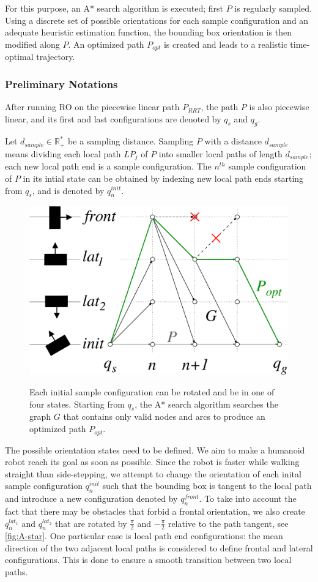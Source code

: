 For this purpose, an A* search algorithm is executed; first $P$ is
regularly sampled. Using a discrete set of possible orientations for
each sample configuration and an adequate heuristic estimation
function, the bounding box orientation is then modified along $P$. An
optimized path $P_{opt}$ is created and leads to a realistic
time-optimal trajectory.

\subsubsection{Preliminary Notations}
After running RO on the piecewise linear path $P_{RRT}$, the
path $P$ is also piecewise linear, and its first and last
configurations are denoted by $q_s$ and $q_g$.

Let $d_{sample} \in \mathbb{R}_+^*$ be a sampling distance. Sampling
$P$ with a distance $d_{sample}$ means dividing each local path $LP_j$
of $P$ into smaller local paths of length $d_{sample}$; each new local
path end is a sample configuration. The $n^{th}$ sample configuration
of $P$ in its intial state can be obtained by indexing new local path
ends starting from $q_s$, and is denoted by $q_n^{init}$.

\begin{figure}
  \centering
      {\includegraphics[width = 0.75\linewidth]
        {src/chap1-path-optimization/A-star.pdf}}
      \caption{Each initial sample configuration can be rotated and be
        in one of four states. Starting from $q_s$, the A* search
        algorithm searches the graph $G$ that contains only valid
        nodes and arcs to produce an optimized path $P_{opt}$.}
      \label{fig:A-star}
\end{figure}

The possible orientation states need to be defined. We aim to make a
humanoid robot reach its goal as soon as possible. Since the robot is
faster while walking straight than side-stepping, we attempt to change
the orientation of each inital sample configuration $q_n^{init}$ such
that the bounding box is tangent to the local path and introduce a new
configuration denoted by $q_n^{front}$. To take into account the fact
that there may be obstacles that forbid a frontal orientation, we also
create $q_n^{lat_1}$ and $q_n^{lat_2}$ that are rotated by
$\frac{\pi}{2}$ and $-\frac{\pi}{2}$ relative to the path tangent, see
\autoref{fig:A-star}. One particular case is local path end
configurations: the mean direction of the two adjacent local paths is
considered to define frontal and lateral configurations. This is done
to ensure a smooth transition between two local paths.

